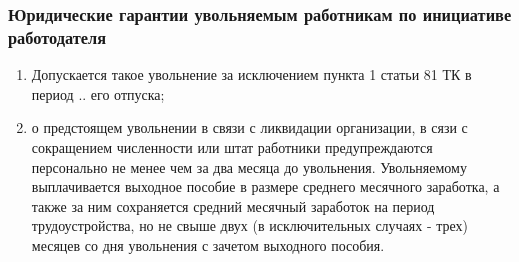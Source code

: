 \subsubsection{Юридические гарантии увольняемым работникам по инициативе работодателя}
\begin{enumerate}
	\item Допускается такое увольнение за исключением пункта 1 статьи 81 ТК в период .. его отпуска;
	\item о предстоящем увольнении в связи с ликвидации организации, в сязи с сокращением численности или штат работники предупреждаются персонально не менее чем за два месяца до увольнения. Увольняемому выплачивается выходное пособие в размере среднего месячного заработка, а также за ним сохраняется средний месячный заработок на период трудоустройства, но не свыше двух (в исключительных случаях - трех) месяцев со дня увольнения с зачетом выходного пособия.
\end{enumerate}
